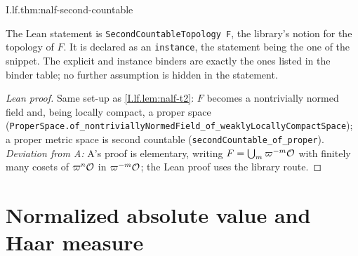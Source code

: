 \begin{theorem}
\end{theorem}
\begin{tfformal}{I.lf.thm:nalf-second-countable}
\begin{tffidelity}
The Lean statement is \texttt{SecondCountableTopology F}, the library's notion for the topology of $F$. It is declared as an \texttt{instance}, the statement being the one of the snippet. The explicit and instance binders are exactly the ones listed in the binder table; no further assumption is hidden in the statement.
\end{tffidelity}
\end{tfformal}
\begin{proof}[Lean proof]
Same set-up as \cref{I.lf.lem:nalf-t2}: $F$ becomes a nontrivially normed field and, being locally compact, a proper space (\texttt{ProperSpace.of\_nontriviallyNormedField\_of\_weaklyLocallyCompactSpace}); a proper metric space is second countable (\texttt{secondCountable\_of\_proper}). \emph{Deviation from A:} A's proof is elementary, writing $F=\bigcup_m\varpi^{-m}\mathcal{O}$ with finitely many cosets of $\varpi^n\mathcal{O}$ in $\varpi^{-m}\mathcal{O}$; the Lean proof uses the library route.
\end{proof}


\section{Normalized absolute value and Haar measure}

